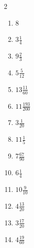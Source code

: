 \documentclass[12pt]{article}
\begin{document}
\begin{multicols}{2}
\begin{enumerate}
\item $ 8 $
\item $ 3 \frac{1}{4} $
\item $ 9 \frac{2}{3} $
\item $ 5 \frac{5}{12} $
\item $ 13 \frac{11}{60} $
\item $ 11 \frac{193}{200} $
\item $ 3 \frac{1}{20} $
\item $ 11 \frac{1}{5} $
\item $ 7 \frac{67}{90} $
\item $ 6 \frac{1}{4} $
\item $ 10 \frac{9}{10} $
\item $ 4 \frac{13}{20} $
\item $ 3 \frac{17}{20} $
\item $ 4 \frac{19}{60} $
\end{enumerate}\end{multicols}\newpage
\end{document}

